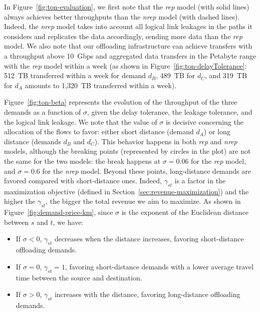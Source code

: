 In Figure~\ref{fig:ton-evaluation}, we first note that the \textit{rep} model (with solid lines) always achieves better throughputs than the \textit{nrep} model (with dashed lines). Indeed, the \textit{nrep} model takes into account all logical link leakages in the paths it considers and replicates the data accordingly, sending more data than the \textit{rep} model. We also note that our offloading infrastructure can achieve transfers with a throughput above 10~Gbps and aggregated data transfers in the Petabyte range with the \textit{rep} model within a week (\ie as shown in Figure~\ref{fig:ton-delayTolerance}: 512~TB transferred within a week for demand $d_B$, 489~TB for $d_C$, and 319~TB for $d_A$ amounts to 1,320~TB transferred within a week).

Figure~\ref{fig:ton-beta} represents the evolution of the throughput of the three demands as a function of $\sigma$, given the delay tolerance, the leakage tolerance, and the logical link leakage. We note that the value of $\sigma$ is decisive concerning the allocation of the flows to favor: either short distance (demand $d_A$) or long distance (demands $d_B$ and $d_C$). This behavior happens in both \textit{rep} and \textit{nrep} models, although the breaking points (represented by circles in the plot) are not the same for the two models: the break happens at $\sigma = 0.06$ for the \textit{rep} model, and $\sigma = 0.6$ for the \textit{nrep} model. Beyond these points, long-distance demands are favored compared with short-distance ones. Indeed, $\gamma_{st}$ is a factor in the maximization objective (defined in Section~\ref{sec:revenue-maximization}) and the higher the $\gamma_{st}$, the bigger the total revenue we aim to maximize. As shown in Figure~\ref{fig:demand-price-km}, since $\sigma$ is the exponent of the Euclidean distance between $s$ and $t$, we have:

\begin{itemize}

	\item If $\sigma < 0$, $\gamma_{st}$ decreases when the distance increases, favoring short-distance offloading demands.

	\item If $\sigma = 0$, $\gamma_{st} = 1$, favoring short-distance demands with a lower average travel time between the source and destination.

	\item If $\sigma > 0$, $\gamma_{st}$ increases with the distance, favoring long-distance offloading demands.

\end{itemize}

